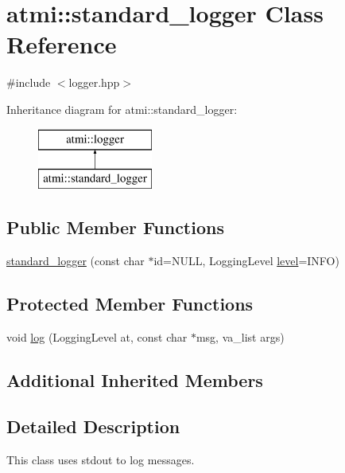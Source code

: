 \hypertarget{classatmi_1_1standard__logger}{}\section{atmi\+:\+:standard\+\_\+logger Class Reference}
\label{classatmi_1_1standard__logger}


{\ttfamily \#include $<$logger.\+hpp$>$}

Inheritance diagram for atmi\+:\+:standard\+\_\+logger\+:\begin{figure}[H]
\begin{center}
\leavevmode
\includegraphics[height=2.000000cm]{classatmi_1_1standard__logger}
\end{center}
\end{figure}
\subsection*{Public Member Functions}
\begin{DoxyCompactItemize}
\item 
\hyperlink{classatmi_1_1standard__logger_a1f1d082ae9c3aa8eb63ea0911b31af81}{standard\+\_\+logger} (const char $\ast$id=N\+U\+L\+L, Logging\+Level \hyperlink{classatmi_1_1logger_a70bf3a05b911b63d4548507fdea5dfbd}{level}=I\+N\+F\+O)
\end{DoxyCompactItemize}
\subsection*{Protected Member Functions}
\begin{DoxyCompactItemize}
\item 
void \hyperlink{classatmi_1_1standard__logger_ab3e14ab83476e546a0cb27803d787092}{log} (Logging\+Level at, const char $\ast$msg, va\+\_\+list args)
\end{DoxyCompactItemize}
\subsection*{Additional Inherited Members}


\subsection{Detailed Description}
This class uses stdout to log messages.

